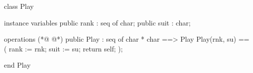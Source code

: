 \begin{vdmpp}[breaklines=true]
class Play

 instance variables
  public rank : seq of char;
  public suit : char;


 operations
(*@
\label{Play:9}
@*)
  public Play : seq of char * char ==> Play
  Play(rnk, su) == 
  (
   rank := rnk;
   suit := su;
   return self;
  );
 
end Play
\end{vdmpp}
